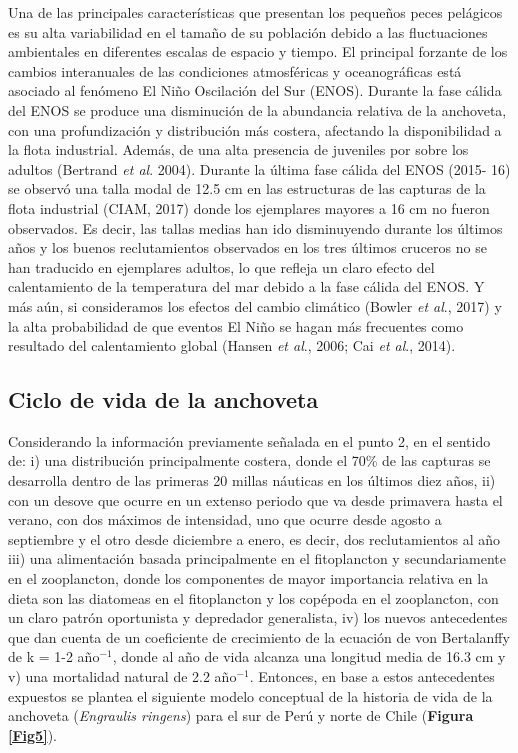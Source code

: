\documentclass[letter,11pt]{article}
\begin{document}
Una de las principales caracter\'isticas que presentan los peque\~{n}os peces
pel\'agicos es su alta variabilidad en el tama\~{n}o de su poblaci\'on debido a
las fluctuaciones ambientales en diferentes escalas de espacio y tiempo.
El principal forzante de los cambios interanuales de las condiciones
atmosf\'ericas y oceanogr\'aficas est\'a asociado al fen\'omeno El Ni\~{n}o
Oscilaci\'on del Sur (ENOS). Durante la fase c\'alida del ENOS se produce
una disminuci\'on de la abundancia relativa de la anchoveta, con una
profundizaci\'on y distribuci\'on m\'as costera, afectando la disponibilidad a
la flota industrial. Adem\'as, de una alta presencia de juveniles por
sobre los adultos (Bertrand \textit{et al}. 2004). Durante la \'ultima
fase c\'alida del ENOS (2015- 16) se observ\'o una talla modal de 12.5 cm en
las estructuras de las capturas de la flota industrial (CIAM, 2017)
donde los ejemplares mayores a 16 cm no fueron observados. Es decir, las
tallas medias han ido disminuyendo durante los \'ultimos a\~{n}os y los buenos
reclutamientos observados en los tres \'ultimos cruceros no se han
traducido en ejemplares adultos, lo que refleja un claro efecto del
calentamiento de la temperatura del mar debido a la fase c\'alida del
ENOS. Y m\'as a\'un, si consideramos los efectos del cambio clim\'atico
(Bowler \textit{et al}., 2017) y la alta probabilidad de que eventos
El Ni\~{n}o se hagan m\'as frecuentes como resultado del calentamiento
global (Hansen \textit{et al}., 2006; Cai \textit{et al}., 2014).


\subsection{Ciclo de vida de la anchoveta}

Considerando la informaci\'on previamente se\~{n}alada en el punto 2, en el
sentido de: i) una distribuci\'on principalmente costera, donde el 70\% de
las capturas se desarrolla dentro de las primeras 20 millas n\'auticas en
los \'ultimos diez a\~{n}os, ii) con un desove que ocurre en un extenso
periodo que va desde primavera hasta el verano, con dos m\'aximos de
intensidad, uno que ocurre desde agosto a septiembre y el otro desde
diciembre a enero, es decir, dos reclutamientos al a\~{n}o iii) una
alimentaci\'on basada principalmente en el fitoplancton y secundariamente
en el zooplancton, donde los componentes de mayor importancia relativa
en la dieta son las diatomeas en el fitoplancton y los cop\'epoda en el
zooplancton, con un claro patr\'on oportunista y depredador generalista,
iv) los nuevos antecedentes que dan cuenta de un coeficiente de
crecimiento de la ecuaci\'on de von Bertalanffy de k = 1-2 a\~{n}o$^{-1}$,
donde al a\~{n}o de vida alcanza una longitud media de 16.3 cm y v) una
mortalidad natural de 2.2 a\~{n}o$^{-1}$. Entonces, en base a estos
antecedentes expuestos se plantea el siguiente modelo conceptual de la
historia de vida de la anchoveta (\textit{Engraulis ringens}) para el
sur de Per\'u y norte de Chile (\textbf{Figura \ref{Fig5}}).
\end{document}
